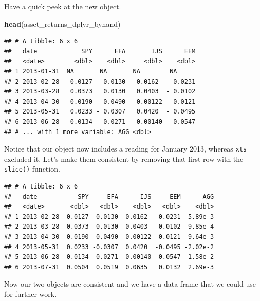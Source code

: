 \documentclass[]{krantz}
\makeatletter
\newenvironment{Shaded}{\begin{snugshade}}{\end{snugshade}}
\newcommand{\KeywordTok}[1]{\textcolor[rgb]{0.13,0.29,0.53}{\textbf{#1}}}
\newcommand{\DecValTok}[1]{\textcolor[rgb]{0.00,0.00,0.81}{#1}}
\newcommand{\StringTok}[1]{\textcolor[rgb]{0.31,0.60,0.02}{#1}}
\newcommand{\OperatorTok}[1]{\textcolor[rgb]{0.81,0.36,0.00}{\textbf{#1}}}
\newcommand{\NormalTok}[1]{#1}
\newenvironment{kframe}{%
\medskip{}
\setlength{\fboxsep}{.8em}
 \def\at@end@of@kframe{}%
 \ifinner\ifhmode%
  \def\at@end@of@kframe{\end{minipage}}%
  \begin{minipage}{\columnwidth}%
 \fi\fi%
 \def\FrameCommand##1{\hskip\@totalleftmargin \hskip-\fboxsep
 \colorbox{shadecolor}{##1}\hskip-\fboxsep
     \hskip-\linewidth \hskip-\@totalleftmargin \hskip\columnwidth}%
 \MakeFramed {\advance\hsize-\width
   \@totalleftmargin\z@ \linewidth\hsize
   \@setminipage}}%
 {\par\unskip\endMakeFramed%
 \at@end@of@kframe}
\renewenvironment{Shaded}{\begin{kframe}}{\end{kframe}}
\makeatother
\begin{document}
Have a quick peek at the new object.

\begin{Shaded}
\begin{Highlighting}[]
\KeywordTok{head}\NormalTok{(asset_returns_dplyr_byhand)}
\end{Highlighting}
\end{Shaded}

\begin{verbatim}
## # A tibble: 6 x 6
##   date            SPY      EFA       IJS      EEM
##   <date>        <dbl>    <dbl>     <dbl>    <dbl>
## 1 2013-01-31  NA       NA       NA        NA     
## 2 2013-02-28   0.0127 - 0.0130   0.0162  - 0.0231
## 3 2013-03-28   0.0373   0.0130   0.0403  - 0.0102
## 4 2013-04-30   0.0190   0.0490   0.00122   0.0121
## 5 2013-05-31   0.0233 - 0.0307   0.0420  - 0.0495
## 6 2013-06-28 - 0.0134 - 0.0271 - 0.00140 - 0.0547
## # ... with 1 more variable: AGG <dbl>
\end{verbatim}

Notice that our object now includes a reading for January 2013, whereas
\texttt{xts} excluded it. Let's make them consistent by removing that
first row with the \texttt{slice()} function.

\begin{Shaded}
\end{Shaded}

\begin{verbatim}
## # A tibble: 6 x 6
##   date           SPY     EFA      IJS     EEM      AGG
##   <date>       <dbl>   <dbl>    <dbl>   <dbl>    <dbl>
## 1 2013-02-28  0.0127 -0.0130  0.0162  -0.0231  5.89e-3
## 2 2013-03-28  0.0373  0.0130  0.0403  -0.0102  9.85e-4
## 3 2013-04-30  0.0190  0.0490  0.00122  0.0121  9.64e-3
## 4 2013-05-31  0.0233 -0.0307  0.0420  -0.0495 -2.02e-2
## 5 2013-06-28 -0.0134 -0.0271 -0.00140 -0.0547 -1.58e-2
## 6 2013-07-31  0.0504  0.0519  0.0635   0.0132  2.69e-3
\end{verbatim}

Now our two objects are consistent and we have a data frame that we
could use for further work.
\end{document}
